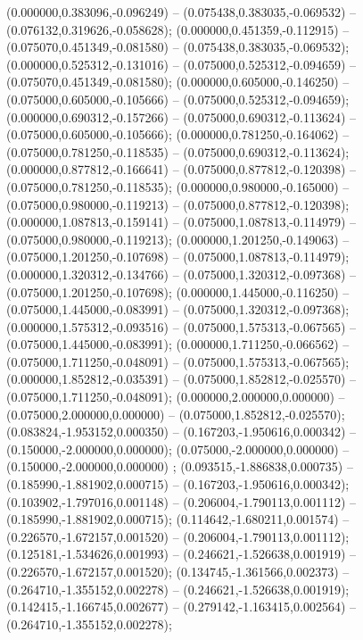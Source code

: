 (0.000000,0.383096,-0.096249) -- (0.075438,0.383035,-0.069532) -- (0.076132,0.319626,-0.058628);
 (0.000000,0.451359,-0.112915) -- (0.075070,0.451349,-0.081580) -- (0.075438,0.383035,-0.069532);
 (0.000000,0.525312,-0.131016) -- (0.075000,0.525312,-0.094659) -- (0.075070,0.451349,-0.081580);
 (0.000000,0.605000,-0.146250) -- (0.075000,0.605000,-0.105666) -- (0.075000,0.525312,-0.094659);
 (0.000000,0.690312,-0.157266) -- (0.075000,0.690312,-0.113624) -- (0.075000,0.605000,-0.105666);
 (0.000000,0.781250,-0.164062) -- (0.075000,0.781250,-0.118535) -- (0.075000,0.690312,-0.113624);
 (0.000000,0.877812,-0.166641) -- (0.075000,0.877812,-0.120398) -- (0.075000,0.781250,-0.118535);
 (0.000000,0.980000,-0.165000) -- (0.075000,0.980000,-0.119213) -- (0.075000,0.877812,-0.120398);
 (0.000000,1.087813,-0.159141) -- (0.075000,1.087813,-0.114979) -- (0.075000,0.980000,-0.119213);
 (0.000000,1.201250,-0.149063) -- (0.075000,1.201250,-0.107698) -- (0.075000,1.087813,-0.114979);
 (0.000000,1.320312,-0.134766) -- (0.075000,1.320312,-0.097368) -- (0.075000,1.201250,-0.107698);
 (0.000000,1.445000,-0.116250) -- (0.075000,1.445000,-0.083991) -- (0.075000,1.320312,-0.097368);
 (0.000000,1.575312,-0.093516) -- (0.075000,1.575313,-0.067565) -- (0.075000,1.445000,-0.083991);
 (0.000000,1.711250,-0.066562) -- (0.075000,1.711250,-0.048091) -- (0.075000,1.575313,-0.067565);
 (0.000000,1.852812,-0.035391) -- (0.075000,1.852812,-0.025570) -- (0.075000,1.711250,-0.048091);
 (0.000000,2.000000,0.000000) -- (0.075000,2.000000,0.000000) -- (0.075000,1.852812,-0.025570);
 (0.083824,-1.953152,0.000350) -- (0.167203,-1.950616,0.000342) -- (0.150000,-2.000000,0.000000);
 (0.075000,-2.000000,0.000000) -- (0.150000,-2.000000,0.000000) ;
 (0.093515,-1.886838,0.000735) -- (0.185990,-1.881902,0.000715) -- (0.167203,-1.950616,0.000342);
 (0.103902,-1.797016,0.001148) -- (0.206004,-1.790113,0.001112) -- (0.185990,-1.881902,0.000715);
 (0.114642,-1.680211,0.001574) -- (0.226570,-1.672157,0.001520) -- (0.206004,-1.790113,0.001112);
 (0.125181,-1.534626,0.001993) -- (0.246621,-1.526638,0.001919) -- (0.226570,-1.672157,0.001520);
 (0.134745,-1.361566,0.002373) -- (0.264710,-1.355152,0.002278) -- (0.246621,-1.526638,0.001919);
 (0.142415,-1.166745,0.002677) -- (0.279142,-1.163415,0.002564) -- (0.264710,-1.355152,0.002278);
